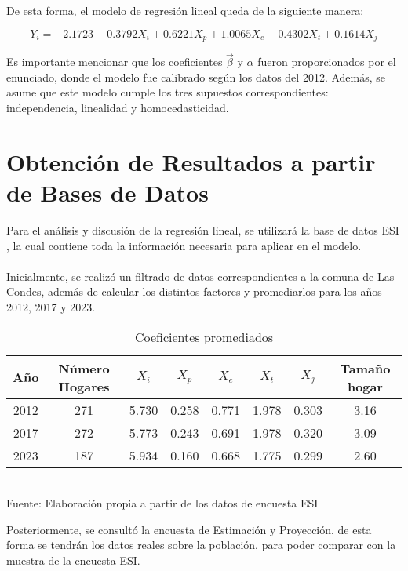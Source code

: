 \documentclass[12pt]{article} %
\begin{document}
De esta forma, el modelo de regresión lineal queda de la siguiente manera:

\begin{equation}
    Y_i = -2.1723 + 0.3792X_i + 0.6221X_p + 1.0065X_e + 0.4302X_t + 0.1614X_j
    \label{eq:regresion}
\end{equation}

Es importante mencionar que los coeficientes $\vec{\beta}$ y $\alpha$ fueron proporcionados por el enunciado, donde el modelo fue calibrado según los datos del 2012. Además, se asume que este modelo cumple los tres supuestos correspondientes: independencia, linealidad y homocedasticidad.

\section{Obtención de Resultados a partir de Bases de Datos}

Para el análisis y discusión de la regresión lineal, se utilizará la base de datos ESI \textbf{\cite{esi}}, la cual contiene toda la información necesaria para aplicar en el modelo.
\\ \\
Inicialmente, se realizó un filtrado de datos correspondientes a la comuna de Las Condes, además de calcular los distintos factores y promediarlos para los años 2012, 2017 y 2023.

\begin{table}[H]
    \centering
    \caption{Coeficientes promediados}
    \vspace{0.2cm}
    \begin{tabular}{|c|c|c|c|c|c|c|c|}
        \hline
        Año & Número Hogares & $X_i$ & $X_p$ & $X_e$ & $X_t$ & $X_j$ & Tamaño hogar \\
        \hline
        2012 & 271 & 5.730 & 0.258 & 0.771 & 1.978 & 0.303 & 3.16\\
        2017 & 272 & 5.773 & 0.243 & 0.691 & 1.978 & 0.320 & 3.09\\
        2023 & 187 & 5.934 & 0.160 & 0.668 & 1.775 & 0.299 & 2.60\\
        \hline
    \end{tabular}
    \vspace{0.2cm}
    \\Fuente: Elaboración propia a partir de los datos de encuesta ESI \textbf{\cite{esi}}
\end{table}

Posteriormente, se consultó la encuesta de Estimación y Proyección, de esta forma se tendrán los datos reales sobre la población, para poder comparar con la muestra de la encuesta ESI.
\end{document}

